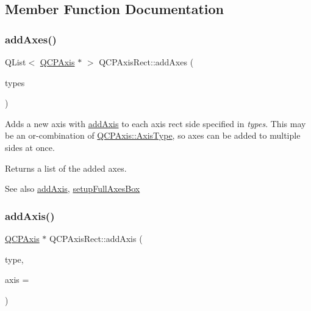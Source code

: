 \subsection{Member Function Documentation}
\mbox{\label{class_q_c_p_axis_rect_a792e1f3d9cb1591fca135bb0de9b81fc}} 
\subsubsection{\texorpdfstring{addAxes()}{addAxes()}}
{\footnotesize\ttfamily Q\+List$<$ \mbox{\hyperlink{class_q_c_p_axis}{Q\+C\+P\+Axis}} $\ast$ $>$ Q\+C\+P\+Axis\+Rect\+::add\+Axes (\begin{DoxyParamCaption}\item[{Q\+C\+P\+Axis\+::\+Axis\+Types}]{types }\end{DoxyParamCaption})}

Adds a new axis with \mbox{\hyperlink{class_q_c_p_axis_rect_a2dc336092ccc57d44a46194c8a23e4f4}{add\+Axis}} to each axis rect side specified in {\itshape types}. This may be an {\ttfamily or}-\/combination of \mbox{\hyperlink{class_q_c_p_axis_ae2bcc1728b382f10f064612b368bc18a}{Q\+C\+P\+Axis\+::\+Axis\+Type}}, so axes can be added to multiple sides at once.

Returns a list of the added axes.

\begin{DoxySeeAlso}{See also}
\mbox{\hyperlink{class_q_c_p_axis_rect_a2dc336092ccc57d44a46194c8a23e4f4}{add\+Axis}}, \mbox{\hyperlink{class_q_c_p_axis_rect_a5fa906175447b14206954f77fc7f1ef4}{setup\+Full\+Axes\+Box}} 
\end{DoxySeeAlso}
\mbox{\label{class_q_c_p_axis_rect_a2dc336092ccc57d44a46194c8a23e4f4}} 
\subsubsection{\texorpdfstring{addAxis()}{addAxis()}}
{\footnotesize\ttfamily \mbox{\hyperlink{class_q_c_p_axis}{Q\+C\+P\+Axis}} $\ast$ Q\+C\+P\+Axis\+Rect\+::add\+Axis (\begin{DoxyParamCaption}\item[{\mbox{\hyperlink{class_q_c_p_axis_ae2bcc1728b382f10f064612b368bc18a}{Q\+C\+P\+Axis\+::\+Axis\+Type}}}]{type,  }\item[{\mbox{\hyperlink{class_q_c_p_axis}{Q\+C\+P\+Axis}} $\ast$}]{axis = {} }\end{DoxyParamCaption})}


